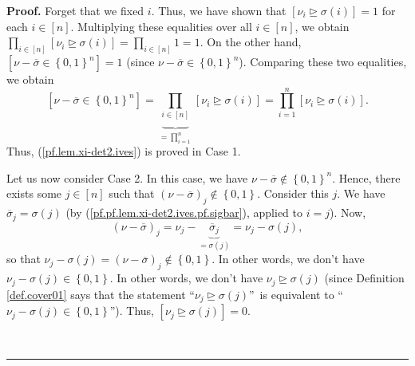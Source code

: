 \documentclass[numbers=enddot,12pt,final,onecolumn,notitlepage,english]{scrartcl}%
\theoremstyle{definition}
\newenvironment{proof}[1][Proof]{\noindent\textbf{#1.} }{\ \rule{0.5em}{0.5em}}
\let\prodnonlimits\prod
\renewcommand{\prod}{\prodnonlimits\limits}
\newenvironment{verlong}{}{}
\begin{document}
\begin{verlong}
\begin{proof}
Forget that we fixed $i$. Thus, we have shown that $\left[  \nu_{i}%
\trianglerighteq\sigma\left(  i\right)  \right]  =1$ for each $i\in\left[
n\right]  $. Multiplying these equalities over all $i\in\left[  n\right]  $,
we obtain $\prod_{i\in\left[  n\right]  }\left[  \nu_{i}\trianglerighteq
\sigma\left(  i\right)  \right]  =\prod_{i\in\left[  n\right]  }1=1$. On the
other hand, $\left[  \nu-\overline{\sigma}\in\left\{  0,1\right\}
^{n}\right]  =1$ (since $\nu-\overline{\sigma}\in\left\{  0,1\right\}  ^{n}$).
Comparing these two equalities, we obtain%
\[
\left[  \nu-\overline{\sigma}\in\left\{  0,1\right\}  ^{n}\right]
=\underbrace{\prod_{i\in\left[  n\right]  }}_{=\prod_{i=1}^{n}}\left[  \nu
_{i}\trianglerighteq\sigma\left(  i\right)  \right]  =\prod_{i=1}^{n}\left[
\nu_{i}\trianglerighteq\sigma\left(  i\right)  \right]  .
\]
Thus, (\ref{pf.lem.xi-det2.ives}) is proved in Case 1. \medskip

Let us now consider Case 2. In this case, we have $\nu-\overline{\sigma}%
\notin\left\{  0,1\right\}  ^{n}$. Hence, there exists some $j\in\left[
n\right]  $ such that $\left(  \nu-\overline{\sigma}\right)  _{j}%
\notin\left\{  0,1\right\}  $. Consider this $j$. We have $\overline{\sigma
}_{j}=\sigma\left(  j\right)  $ (by (\ref{pf.pf.lem.xi-det2.ives.pf.sigbar}),
applied to $i=j$). Now,
\[
\left(  \nu-\overline{\sigma}\right)  _{j}=\nu_{j}-\underbrace{\overline
{\sigma}_{j}}_{=\sigma\left(  j\right)  }=\nu_{j}-\sigma\left(  j\right)  ,
\]
so that $\nu_{j}-\sigma\left(  j\right)  =\left(  \nu-\overline{\sigma
}\right)  _{j}\notin\left\{  0,1\right\}  $. In other words, we don't have
$\nu_{j}-\sigma\left(  j\right)  \in\left\{  0,1\right\}  $. In other words,
we don't have $\nu_{j}\trianglerighteq\sigma\left(  j\right)  $ (since
Definition \ref{def.cover01} says that the statement \textquotedblleft$\nu
_{j}\trianglerighteq\sigma\left(  j\right)  $\textquotedblright\ is equivalent
to \textquotedblleft$\nu_{j}-\sigma\left(  j\right)  \in\left\{  0,1\right\}
$\textquotedblright). Thus, $\left[  \nu_{j}\trianglerighteq\sigma\left(
j\right)  \right]  =0$.


\end{proof}
\end{verlong}
\end{document}
